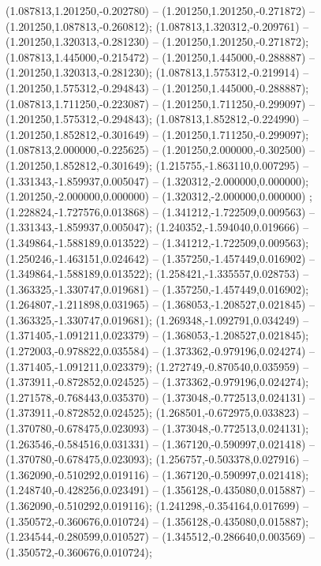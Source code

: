  (1.087813,1.201250,-0.202780) -- (1.201250,1.201250,-0.271872) -- (1.201250,1.087813,-0.260812);
 (1.087813,1.320312,-0.209761) -- (1.201250,1.320313,-0.281230) -- (1.201250,1.201250,-0.271872);
 (1.087813,1.445000,-0.215472) -- (1.201250,1.445000,-0.288887) -- (1.201250,1.320313,-0.281230);
 (1.087813,1.575312,-0.219914) -- (1.201250,1.575312,-0.294843) -- (1.201250,1.445000,-0.288887);
 (1.087813,1.711250,-0.223087) -- (1.201250,1.711250,-0.299097) -- (1.201250,1.575312,-0.294843);
 (1.087813,1.852812,-0.224990) -- (1.201250,1.852812,-0.301649) -- (1.201250,1.711250,-0.299097);
 (1.087813,2.000000,-0.225625) -- (1.201250,2.000000,-0.302500) -- (1.201250,1.852812,-0.301649);
 (1.215755,-1.863110,0.007295) -- (1.331343,-1.859937,0.005047) -- (1.320312,-2.000000,0.000000);
 (1.201250,-2.000000,0.000000) -- (1.320312,-2.000000,0.000000) ;
 (1.228824,-1.727576,0.013868) -- (1.341212,-1.722509,0.009563) -- (1.331343,-1.859937,0.005047);
 (1.240352,-1.594040,0.019666) -- (1.349864,-1.588189,0.013522) -- (1.341212,-1.722509,0.009563);
 (1.250246,-1.463151,0.024642) -- (1.357250,-1.457449,0.016902) -- (1.349864,-1.588189,0.013522);
 (1.258421,-1.335557,0.028753) -- (1.363325,-1.330747,0.019681) -- (1.357250,-1.457449,0.016902);
 (1.264807,-1.211898,0.031965) -- (1.368053,-1.208527,0.021845) -- (1.363325,-1.330747,0.019681);
 (1.269348,-1.092791,0.034249) -- (1.371405,-1.091211,0.023379) -- (1.368053,-1.208527,0.021845);
 (1.272003,-0.978822,0.035584) -- (1.373362,-0.979196,0.024274) -- (1.371405,-1.091211,0.023379);
 (1.272749,-0.870540,0.035959) -- (1.373911,-0.872852,0.024525) -- (1.373362,-0.979196,0.024274);
 (1.271578,-0.768443,0.035370) -- (1.373048,-0.772513,0.024131) -- (1.373911,-0.872852,0.024525);
 (1.268501,-0.672975,0.033823) -- (1.370780,-0.678475,0.023093) -- (1.373048,-0.772513,0.024131);
 (1.263546,-0.584516,0.031331) -- (1.367120,-0.590997,0.021418) -- (1.370780,-0.678475,0.023093);
 (1.256757,-0.503378,0.027916) -- (1.362090,-0.510292,0.019116) -- (1.367120,-0.590997,0.021418);
 (1.248740,-0.428256,0.023491) -- (1.356128,-0.435080,0.015887) -- (1.362090,-0.510292,0.019116);
 (1.241298,-0.354164,0.017699) -- (1.350572,-0.360676,0.010724) -- (1.356128,-0.435080,0.015887);
 (1.234544,-0.280599,0.010527) -- (1.345512,-0.286640,0.003569) -- (1.350572,-0.360676,0.010724);
